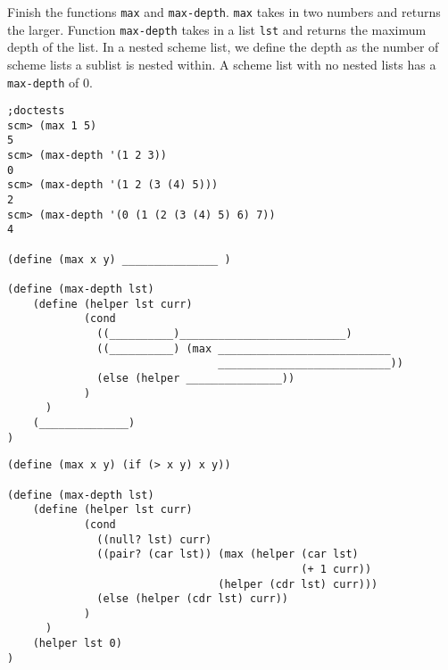 \question Finish the functions \lstinline{max} and \lstinline{max-depth}. \lstinline{max} takes in two numbers and returns the larger. Function \lstinline{max-depth} takes in a list \lstinline{lst} and returns the maximum depth of the list. In a nested scheme list, we define the depth as the number of scheme lists a sublist is nested within. A scheme list with no nested lists has a \lstinline{max-depth} of 0. 

\begin{lstlisting}
;doctests
scm> (max 1 5)
5
scm> (max-depth '(1 2 3))
0
scm> (max-depth '(1 2 (3 (4) 5)))
2
scm> (max-depth '(0 (1 (2 (3 (4) 5) 6) 7))
4

(define (max x y) _______________ )

(define (max-depth lst)
    (define (helper lst curr)
            (cond 
              ((__________)__________________________)
              ((__________) (max ___________________________
                                 ___________________________))
              (else (helper _______________))
            )
      )
    (______________)
)
\end{lstlisting}

\begin{solution}
\begin{lstlisting}
(define (max x y) (if (> x y) x y))

(define (max-depth lst)
    (define (helper lst curr)
            (cond 
              ((null? lst) curr)
              ((pair? (car lst)) (max (helper (car lst) 
                                              (+ 1 curr)) 
                                 (helper (cdr lst) curr)))
              (else (helper (cdr lst) curr))
            )
      )
    (helper lst 0)
)

\end{lstlisting}
\end{solution}
